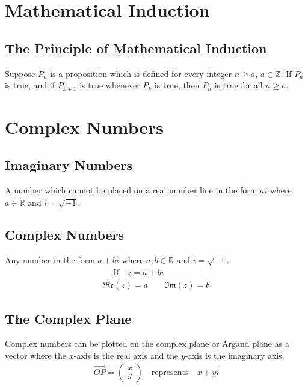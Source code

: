 \documentclass[10pt, a4paper, titlepage]{article}
\begin{document}
\begin{multicols*}{3}
	\hrulefill


\section{Mathematical Induction}
	\subsection{The Principle of Mathematical Induction}
	Suppose $P_n$ is a proposition which is defined for every integer $n\geq a$, $a\in \mathbb{Z}$. If $P_a$ is true, and if $P_{k+1}$ is true whenever $P_k$ is true, then $P_n$ is true for all $n\geq a$.

	\hrulefill


\section{Complex Numbers}
	\subsection{Imaginary Numbers}
	A number which cannot be placed on a real number line in the form $ai$ where $a\in \mathbb{R}$ and $i=\sqrt{-1}$.\\

	\dotfill
	\subsection{Complex Numbers}
	Any number in the form $a+bi$ where $a,b\in \mathbb{R}$ and $i=\sqrt{-1}$.
	\begin{gather}
		\begin{flalign}
			&\text{If}\quad z=a+bi&&
		\end{flalign}\\
		\mathfrak{Re} (z)=a\qquad \mathfrak{Im} (z)=b
	\end{gather}

	\dotfill
	\subsection{The Complex Plane}
	Complex numbers can be plotted on the complex plane or Argand plane as a vector where the $x$-axis is the real axis and the $y$-axis is the imaginary axis.
	\begin{align}
		\overrightarrow{OP}=\begin{pmatrix}x\\ y\end{pmatrix}\quad \text{represents}\quad x+yi
	\end{align}
	\dotfill

\end{multicols*}
\end{document}
